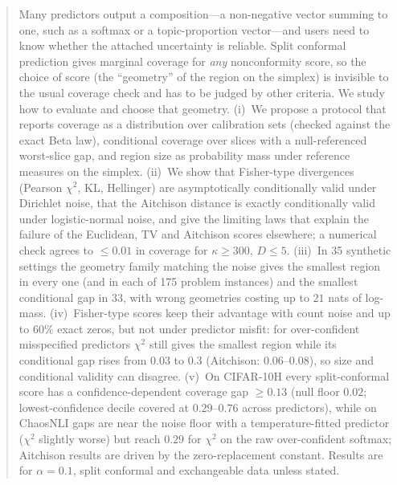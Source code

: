 \documentclass{article}
\theoremstyle{plain}
\theoremstyle{remark}
\begin{document}

\printAffiliationsAndNotice{}

\begin{abstract}
Many predictors output a composition---a non-negative vector summing to one, such as a softmax or a topic-proportion vector---and users need to know whether the attached uncertainty is reliable.
Split conformal prediction gives marginal coverage for \emph{any} nonconformity score, so the choice of score (the ``geometry'' of the region on the simplex) is invisible to the usual coverage check and has to be judged by other criteria.
We study how to evaluate and choose that geometry.
(i)~We propose a protocol that reports coverage as a distribution over calibration sets (checked against the exact Beta law), conditional coverage over slices with a null-referenced worst-slice gap, and region size as probability mass under reference measures on the simplex.
(ii)~We show that Fisher-type divergences (Pearson $\chi^2$, KL, Hellinger) are asymptotically conditionally valid under Dirichlet noise, that the Aitchison distance is exactly conditionally valid under logistic-normal noise, and give the limiting laws that explain the failure of the Euclidean, TV and Aitchison scores elsewhere; a numerical check agrees to $\le 0.01$ in coverage for $\kappa\ge 300$, $D\le5$.
(iii)~In 35 synthetic settings the geometry family matching the noise gives the smallest region in every one (and in each of 175 problem instances) and the smallest conditional gap in 33, with wrong geometries costing up to $21$ nats of log-mass.
(iv)~Fisher-type scores keep their advantage with count noise and up to 60\% exact zeros, but not under predictor misfit: for over-confident misspecified predictors $\chi^2$ still gives the smallest region while its conditional gap rises from $0.03$ to $0.3$ (Aitchison: $0.06$--$0.08$), so size and conditional validity can disagree.
(v)~On CIFAR-10H every split-conformal score has a confidence-dependent coverage gap $\ge0.13$ (null floor $0.02$; lowest-confidence decile covered at $0.29$--$0.76$ across predictors), while on ChaosNLI gaps are near the noise floor with a temperature-fitted predictor ($\chi^2$ slightly worse) but reach $0.29$ for $\chi^2$ on the raw over-confident softmax; Aitchison results are driven by the zero-replacement constant.
Results are for $\alpha=0.1$, split conformal and exchangeable data unless stated.
\end{abstract}
\end{document}
